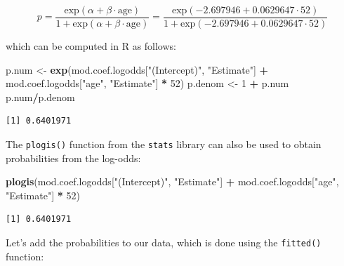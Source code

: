 \documentclass[]{article}
\newenvironment{Shaded}{\begin{snugshade}}{\end{snugshade}}
\newcommand{\KeywordTok}[1]{\textcolor[rgb]{0.13,0.29,0.53}{\textbf{#1}}}
\newcommand{\DataTypeTok}[1]{\textcolor[rgb]{0.13,0.29,0.53}{#1}}
\newcommand{\DecValTok}[1]{\textcolor[rgb]{0.00,0.00,0.81}{#1}}
\newcommand{\StringTok}[1]{\textcolor[rgb]{0.31,0.60,0.02}{#1}}
\newcommand{\OperatorTok}[1]{\textcolor[rgb]{0.81,0.36,0.00}{\textbf{#1}}}
\newcommand{\NormalTok}[1]{#1}
\begin{document}
\[p = \frac{\mbox{exp}(\alpha + \beta \cdot \mbox{age})}{1 + \mbox{exp}(\alpha + \beta \cdot \mbox{age})} = \frac{\mbox{exp}(-2.697946 + 0.0629647 \cdot \mbox{52})}{1 + \mbox{exp}(-2.697946 + 0.0629647 \cdot \mbox{52})}\]

which can be computed in R as follows:

\begin{Shaded}
\begin{Highlighting}[]
\NormalTok{p.num <-}\StringTok{ }\KeywordTok{exp}\NormalTok{(mod.coef.logodds[}\StringTok{"(Intercept)"}\NormalTok{, }\StringTok{"Estimate"}\NormalTok{] }\OperatorTok{+}\StringTok{ }
\StringTok{               }\NormalTok{mod.coef.logodds[}\StringTok{"age"}\NormalTok{, }\StringTok{"Estimate"}\NormalTok{] }\OperatorTok{*}\StringTok{ }\DecValTok{52}\NormalTok{)}
\NormalTok{p.denom <-}\StringTok{ }\DecValTok{1} \OperatorTok{+}\StringTok{ }\NormalTok{p.num}
\NormalTok{p.num}\OperatorTok{/}\NormalTok{p.denom}
\end{Highlighting}
\end{Shaded}

\begin{verbatim}
[1] 0.6401971
\end{verbatim}

The \texttt{plogis()} function from the \texttt{stats} library can also
be used to obtain probabilities from the log-odds:

\begin{Shaded}
\begin{Highlighting}[]
\KeywordTok{plogis}\NormalTok{(mod.coef.logodds[}\StringTok{"(Intercept)"}\NormalTok{, }\StringTok{"Estimate"}\NormalTok{] }\OperatorTok{+}\StringTok{ }
\StringTok{         }\NormalTok{mod.coef.logodds[}\StringTok{"age"}\NormalTok{, }\StringTok{"Estimate"}\NormalTok{] }\OperatorTok{*}\StringTok{ }\DecValTok{52}\NormalTok{)}
\end{Highlighting}
\end{Shaded}

\begin{verbatim}
[1] 0.6401971
\end{verbatim}

Let's add the probabilities to our data, which is done using the
\texttt{fitted()} function:

\begin{Shaded}
\end{Shaded}
\end{document}
